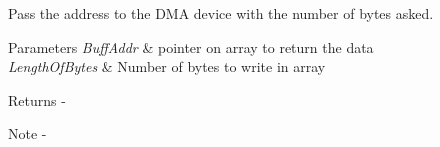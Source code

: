 Pass the address to the D\+MA device with the number of bytes asked. 


\begin{DoxyParams}{Parameters}
{\em Buff\+Addr} & pointer on array to return the data \\
\hline
{\em Length\+Of\+Bytes} & Number of bytes to write in array\\
\hline
\end{DoxyParams}
\begin{DoxyReturn}{Returns}
-\/
\end{DoxyReturn}
\begin{DoxyNote}{Note}
-\/ 
\end{DoxyNote}
